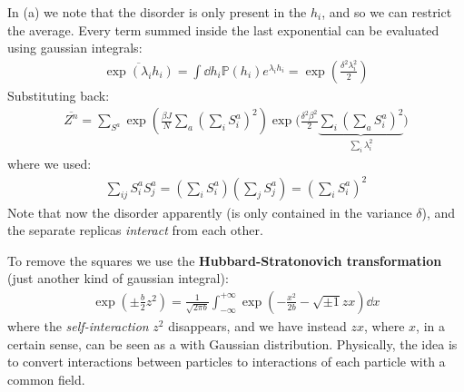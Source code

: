 \documentclass[../template.tex]{subfiles}
\begin{document}
In (a) we note that the disorder is only present in the $h_i$, and so we can restrict the average. Every term summed inside the last exponential can be evaluated using gaussian integrals:
\begin{align*}
    \overline{\exp\left(\lambda_i h_i\right)} = \int \dd{h_i} \mathbb{P}(h_i) e^{\lambda_i h_i} = \exp\left(\frac{\delta^2 \lambda_i^2}{2} \right)
\end{align*}
Substituting back:
\begin{align*}
    \overline{Z^n} = \sum_{S^a} \exp\left(\frac{\beta J }{N} \sum_a \left(\sum_i S_i^a\right)^2 \right) \exp\Big(\frac{\delta^2 \beta^2}{2} \underbrace{\sum_i \left(\sum_a S_i^a\right)^2}_{\sum_i \lambda_i^2}  \Big)
\end{align*}
where we used:
\begin{align*}
    \sum_{ij} S_i^a S_j^a = \left(\sum_i S_i^a\right)\left(\sum_j S_j^a\right) = \left(\sum_i S_i^a\right)^2
\end{align*}
Note that now the disorder apparently  (is only contained in the variance $\delta$), and the separate replicas \textit{interact} from each other.  

To remove the squares we use the \textbf{Hubbard-Stratonovich transformation} (just another kind of gaussian integral):
\begin{align*}
    \exp\left(\pm \frac{b}{2} z^2 \right) = \frac{1}{\sqrt{2 \pi b}} \int_{-\infty}^{+\infty} \exp\left(-\frac{x^2}{2b} - \sqrt{\pm 1} z x \right) \dd{x}
\end{align*} 
where the \textit{self-interaction} $z^2$ disappears, and we have instead $z x$, where $x$, in a certain sense, can be seen as a  with Gaussian distribution. Physically, the idea is to convert interactions between particles to interactions of each particle with a common field. 
\end{document}
